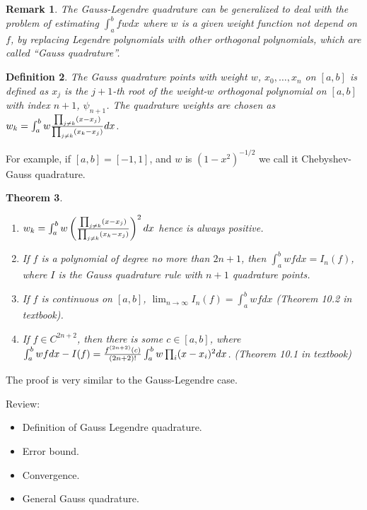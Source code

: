\documentclass[20pt]{article} %
\theoremstyle{break}
\newtheorem{definition}{Definition}[section]
\newtheorem{thm}[definition]{Theorem}
\newtheorem{rem}[definition]{Remark}
\begin{document}
    \begin{rem} The Gauss-Legendre quadrature can be generalized to deal with the problem of estimating $\int_a^bfwdx$ where $w$ is a given weight function not depend on $f$, by replacing Legendre polynomials with other orthogonal polynomials, which are called ``Gauss quadrature''.
    \end{rem}

 \begin{definition}
  The Gauss quadrature points with weight $w$, $x_0,\dots, x_n$ on $[a, b]$ is defined as $x_j$ is the $j+1$-th root of the weight-$w$ orthogonal polynomial on $[a, b]$ with index $n+1$, $\psi_{n+1}$. The quadrature weights are chosen as $w_k=\int_a^bw{\prod_{j\not=k}(x-x_j)\over \prod_{j\not=k}(x_k-x_j)}dx$.
\end{definition}

 For example, if $[a, b]=[-1, 1]$, and $w$ is $(1-x^2)^{-1/2}$ we call it Chebyshev-Gauss quadrature.

\begin{thm}
  \begin{enumerate}
  \item $w_k=\int_a^bw\left({\prod_{j\not=k}(x-x_j)\over \prod_{j\not=k}(x_k-x_j)}\right)^2dx$ hence is always positive.
\item If $f$ is a polynomial of degree no more than $2n+1$, then $\int_a^bwfdx=I_n(f)$, where $I$ is the Gauss quadrature rule with $n+1$ quadrature points.
\item If $f$ is continuous on $[a, b]$, $\lim_{n\rightarrow\infty}I_n(f)=\int_a^bwfdx$ (Theorem 10.2 in textbook).
\item If $f\in C^{2n+2}$, then there is some $c\in [a, b]$, where $\int_a^bwfdx-I(f)={f^{(2n+2)}(c)\over (2n+2)!}\int_a^bw\prod_i(x-x_i)^2 dx$. (Theorem 10.1 in textbook)
  \end{enumerate}
\end{thm}

The proof is very similar to the Gauss-Legendre case.

\newpage

Review:

\begin{itemize}
\item Definition of Gauss Legendre quadrature.
\item Error bound.
\item Convergence.
\item General Gauss quadrature.
\end{itemize}
\end{document}
